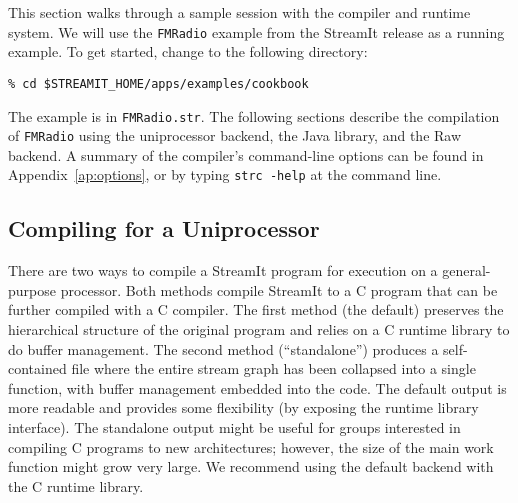 \newcommand{\entry}[1]{\raisebox{0pt}[24pt][20pt]{\parbox{2.75in}{#1}}}
\newcommand{\entrymed}[1]{\raisebox{0pt}[36pt][30pt]{\parbox{2.75in}{#1}}}
\newcommand{\entrybig}[1]{\raisebox{0pt}[42pt][36pt]{\parbox{2.75in}{#1}}}

This section walks through a sample session with the compiler and
runtime system.  We will use the {\tt FMRadio} example from the
StreamIt release as a running example.  To get started, change to the
following directory:
{\small
\begin{verbatim}
% cd $STREAMIT_HOME/apps/examples/cookbook
\end{verbatim}
}
\noindent The example is in {\tt FMRadio.str}. The following
sections describe the compilation of {\tt FMRadio} using the
uniprocessor backend, the Java library, and the Raw backend.  A
summary of the compiler's command-line options can be found in
Appendix~\ref{ap:options}, or by typing {\tt strc -help} at the
command line.

\subsection{Compiling for a Uniprocessor}

There are two ways to compile a StreamIt program for execution on a
general-purpose processor.  Both methods compile StreamIt to a C
program that can be further compiled with a C compiler.  The first
method (the default) preserves the hierarchical structure of the
original program and relies on a C runtime library to do buffer
management.  The second method (``standalone'') produces a
self-contained file where the entire stream graph has been collapsed
into a single function, with buffer management embedded into the code.
The default output is more readable and provides some flexibility (by
exposing the runtime library interface).  The standalone output might
be useful for groups interested in compiling C programs to new
architectures; however, the size of the main work function might grow
very large.  We recommend using the default backend with the C runtime
library.

